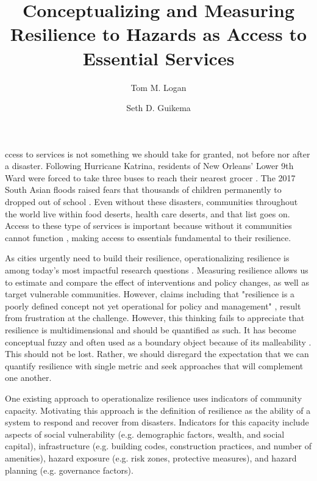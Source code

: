 \documentclass[9pt,twocolumn,twoside,lineno]{pnas-new}
\title{Conceptualizing and Measuring Resilience to Hazards as Access to Essential Services} %
\author[]{Tom M. Logan}
\author{Seth D. Guikema}
\affil{Industrial and Operations Engineering, University of Michigan, Ann Arbor, USA}
\begin{document}
\maketitle
\thispagestyle{firststyle}


ccess to services is not something we should take for granted, not before nor after a disaster. Following Hurricane Katrina, residents of New Orleans' Lower 9th Ward were forced to take three buses to reach their nearest grocer \cite{Netter2016-dm}. The 2017 South Asian floods raised fears that thousands of children permanently to dropped out of school \cite{Watt2017-bs}. Even without these disasters, communities throughout the world live within food deserts, health care deserts, and that list goes on. Access to these type of services is important because without it communities cannot function \cite{Winter1997-kc, Logan2017-fr, Dempsey2011-og}, making access to essentials fundamental to their resilience.

As cities urgently need to build their resilience, operationalizing resilience is among today's most impactful research questions \cite{Caldarice2019-tv}. 
Measuring resilience allows us to estimate and compare the effect of interventions and policy changes, as well as target vulnerable communities. 
However, claims including that "resilience is a poorly defined concept not yet operational for policy and management" \cite{Klein2003-lc, Woolf2016-vm}, result from frustration at the challenge.
However, this thinking fails to appreciate that resilience is multidimensional and should be quantified as such. 
It has become conceptual fuzzy \cite{Caldarice2019-tv} and often used as a boundary object because of its malleability \cite{Meerow2016-definingRes}. 
This should not be lost.
Rather, we should disregard the expectation that we can quantify resilience with single metric \cite{Levine2014-je} and seek approaches that will complement one another.

One existing approach to operationalize resilience uses indicators of community capacity. Motivating this approach is the definition of resilience as the ability of a system to respond and recover from disasters. Indicators for this capacity include aspects of social vulnerability (e.g. demographic factors, wealth, and social capital), infrastructure (e.g. building codes, construction practices, and number of amenities), hazard exposure (e.g. risk zones, protective measures), and hazard planning (e.g. governance factors). 
\end{document}
